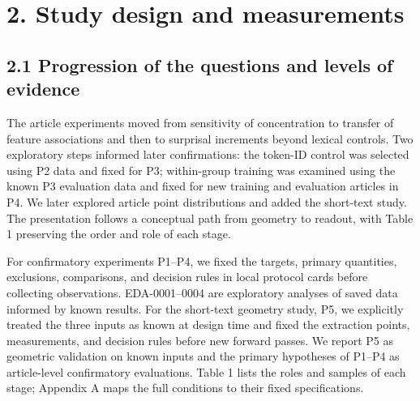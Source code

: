 \FloatBarrier

\section{2. Study design and measurements}\label{study-design-and-measurements}

\FloatBarrier

\subsection{2.1 Progression of the questions and levels of evidence}\label{progression-of-the-questions-and-levels-of-evidence}

The article experiments moved from sensitivity of concentration to transfer of feature associations and then to surprisal increments beyond lexical controls. Two exploratory steps informed later confirmations: the token-ID control was selected using P2 data and fixed for P3; within-group training was examined using the known P3 evaluation data and fixed for new training and evaluation articles in P4. We later explored article point distributions and added the short-text study. The presentation follows a conceptual path from geometry to readout, with Table 1 preserving the order and role of each stage.

For confirmatory experiments P1--P4, we fixed the targets, primary quantities, exclusions, comparisons, and decision rules in local protocol cards before collecting observations. EDA-0001--0004 are exploratory analyses of saved data informed by known results. For the short-text geometry study, P5, we explicitly treated the three inputs as known at design time and fixed the extraction points, measurements, and decision rules before new forward passes. We report P5 as geometric validation on known inputs and the primary hypotheses of P1--P4 as article-level confirmatory evaluations. Table 1 lists the roles and samples of each stage; Appendix A maps the full conditions to their fixed specifications.

